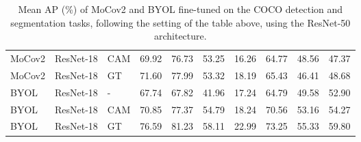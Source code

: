 \begin{table}[t]
{\begin{tabular}{l@{\hspace{8pt}}l@{\hspace{8pt}}l@{\hspace{8pt}}l@{\hspace{6pt}}l@{\hspace{6pt}}l@{\hspace{6pt}}l@{\hspace{6pt}}l@{\hspace{6pt}}l@{\hspace{6pt}}l@{\hspace{6pt}}}
MoCov2 & ResNet-18 & CAM & 69.92 \up{2.54} & 76.73 \up{9.90} & 53.25 \up{11.40} & 16.26 \up{0.90} & 64.77 \up{5.96} & 48.56 \up{2.68} & 47.37 \up{2.00} \\
\rowcolor{lightgray}
MoCov2 & ResNet-18 & GT  & 71.60 \up{4.22} & 77.99 \up{11.16} & 53.32 \up{11.47} & 18.19 \up{2.83} & 65.43 \up{6.62} & 46.41 \up{0.53} & 48.68 \up{3.31} \\
\midrule
BYOL & ResNet-18 & -   & 67.74 & 67.82 & 41.96 & 17.24 & 64.79 & 49.58 & 52.90 \\
BYOL & ResNet-18 & CAM & 70.85 \up{3.11} & 77.37 \up{9.55} & 54.79 \up{12.83} & 18.24 \up{1.00} & 70.56 \up{5.77} & 53.16 \up{3.58} & 54.27 \up{1.37} \\
\rowcolor{lightgray}
BYOL & ResNet-18 & GT  & 76.59 \up{8.85} & 81.23 \up{13.41} & 58.11 \up{16.15} & 22.99 \up{5.75} & 73.25 \up{8.46} & 55.33 \up{5.75} & 59.80 \up{6.90} \\
\bottomrule
\end{tabular}}

\caption{
Mean AP (\%) of MoCov2 and BYOL fine-tuned on the COCO detection and segmentation tasks, following the setting of the table above, using the ResNet-50 architecture.
}\label{tab:multi-det}


\end{table}
